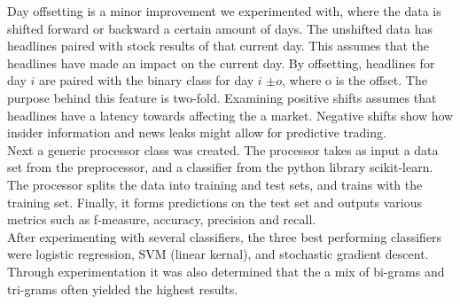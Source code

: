 \documentclass[11pt,a4paper]{article}
\begin{document}
Day offsetting is a minor improvement we experimented with, where the data is shifted forward or backward a certain amount of days. The unshifted data has headlines paired with stock results of that current day. This assumes that the headlines have made an impact on the current day. By offsetting, headlines for day $i$ are paired with the binary class for day $i$ $\pm o$, where o is the offset. The purpose behind this feature is two-fold. Examining positive shifts assumes that headlines have a latency towards affecting the a market. Negative shifts show how insider information and news leaks might allow for predictive trading.\\

Next a generic processor class was created. The processor takes as input a data set from the preprocessor, and a classifier from the python library scikit-learn. The processor splits the data into training and test sets, and trains with the training set. Finally, it forms predictions on the test set and outputs various metrics such as f-measure, accuracy, precision and recall.\\

After experimenting with several classifiers, the three best performing classifiers were logistic regression, SVM (linear kernal), and stochastic gradient descent. Through experimentation it was also determined that the a mix of bi-grams and tri-grams often yielded the highest results.
\end{document}
